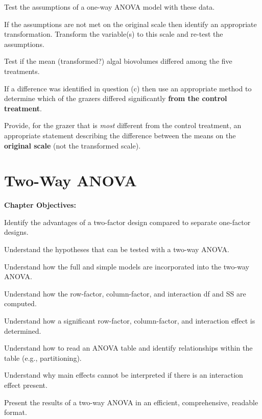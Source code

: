 \documentclass[10pt,openany]{book}\usepackage[]{graphicx}\usepackage[]{color}
\begin{document}
\begin{hwsection}
    \begin{Enumerate}
      \item Test the assumptions of a one-way ANOVA model with these data.
      \item If the assumptions are not met on the original scale then identify an appropriate transformation.  Transform the variable(s) to this scale and re-test the assumptions.
      \item Test if the mean (transformed?) algal biovolumes differed among the five treatments.
      \item If a difference was identified in question (c) then use an appropriate method to determine which of the grazers differed significantly \textbf{from the control treatment}.
      \item Provide, for the grazer that is \emph{most} different from the control treatment, an appropriate statement describing the difference between the means on the \textbf{original scale} (not the transformed scale).
    \end{Enumerate}

\end{hwsection}



\chapter{Two-Way ANOVA}  \label{chap:LMANOVA2}
  \vspace{0pt}
    \begin{ChapObj}{\boxwidth}
      \textbf{Chapter Objectives:}
        \begin{Enumerate}
          \item Identify the advantages of a two-factor design compared to separate one-factor designs.
          \item Understand the hypotheses that can be tested with a two-way ANOVA.
          \item Understand how the full and simple models are incorporated into the two-way ANOVA.
          \item Understand how the row-factor, column-factor, and interaction df and SS are computed.
          \item Understand how a significant row-factor, column-factor, and interaction effect is determined.
          \item Understand how to read an ANOVA table and identify relationships within the table (e.g., partitioning).
          \item Understand why main effects cannot be interpreted if there is an interaction effect present.
          \item Present the results of a two-way ANOVA in an efficient, comprehensive, readable format.
       \end{Enumerate}
    \end{ChapObj}
  \vspace{-24pt}
\minitoc
\newpage
\end{document}
